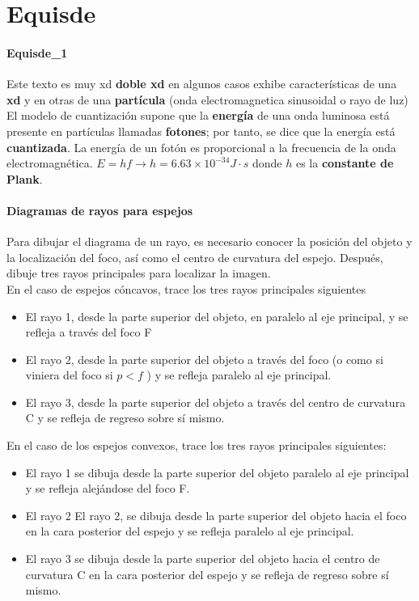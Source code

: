 \documentclass[10pt]{article}
\begin{document}
 
\maketitle

\section{Equisde}

\paragraph{Equisde_1}

Este texto es muy xd \textbf{doble xd} en algunos casos exhibe características de una \textbf{xd} y en otras de una \textbf{partícula} (onda electromagnetica sinusoidal o rayo de luz)\\
El modelo de cuantización supone que la \textbf{energía} de una onda luminosa está presente en partículas llamadas \textbf{fotones}; por tanto, se dice que la energía está \textbf{cuantizada}. La energía de un fotón es proporcional a la frecuencia de la onda electromagnética. $E = hf \rightarrow h = 6.63 \times 10^{-34} J\cdot s$ donde $h$ es la \textbf{constante de Plank}.\\

\paragraph{Diagramas de rayos para espejos}
Para dibujar el diagrama de un rayo, es necesario conocer la posición del objeto y la localización del foco, así como el centro de curvatura del espejo. Después, dibuje tres rayos principales para localizar la imagen.\\
En el caso de espejos cóncavos, trace los tres rayos principales siguientes
\begin{itemize}
	\item El rayo 1, desde la parte superior del objeto, en paralelo al eje principal, y se refleja a través del foco F
	\item El rayo 2, desde la parte superior del objeto a través del foco (o como si viniera del foco si $p < f$ ) y se refleja paralelo al eje principal.
	\item El rayo 3, desde la parte superior del objeto a través del centro de curvatura C y se refleja de regreso sobre sí mismo.
\end{itemize}
En el caso de los espejos convexos, trace los tres rayos principales siguientes:
\begin{itemize}
	\item El rayo 1 se dibuja desde la parte superior del objeto paralelo al eje principal y se refleja alejándose del foco F.
	\item El rayo 2 El rayo 2, se dibuja desde la parte superior del objeto hacia el foco en la cara posterior del espejo y se refleja paralelo al eje principal.
	\item El rayo 3 se dibuja desde la parte superior del objeto hacia el centro de curvatura C en la cara posterior del espejo y se refleja de regreso sobre sí mismo.
\end{itemize}
\end{document}
